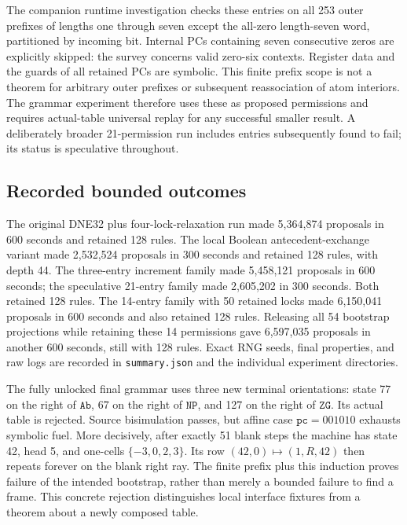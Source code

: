 The companion runtime investigation checks these entries on all 253 outer
prefixes of lengths one through seven except the all-zero length-seven word,
partitioned by incoming bit. Internal PCs containing seven consecutive zeros
are explicitly skipped: the survey concerns valid zero-six contexts. Register
data and the guards of all retained PCs are symbolic. This finite prefix
scope is not a theorem for arbitrary outer prefixes or subsequent reassociation
of atom interiors. The grammar experiment
therefore uses these as proposed permissions and requires actual-table
universal replay for any successful smaller result. A deliberately broader
21-permission run includes entries subsequently found to fail; its status is
speculative throughout.

\subsection{Recorded bounded outcomes}

The original DNE32 plus four-lock-relaxation run made 5,364,874 proposals in
600 seconds and retained 128 rules. The local Boolean antecedent-exchange
variant made 2,532,524 proposals in 300 seconds and retained 128 rules, with
depth 44. The three-entry increment family made 5,458,121 proposals in 600
seconds; the speculative 21-entry family made 2,605,202 in 300 seconds.
Both retained 128 rules. The 14-entry family with 50 retained locks made
6,150,041 proposals in 600 seconds and also retained 128 rules. Releasing all
54 bootstrap projections while retaining these 14 permissions gave 6,597,035
proposals in another 600 seconds, still with 128 rules. Exact RNG
seeds, final properties, and raw logs are recorded in
\texttt{summary.json} and the individual experiment directories.

The fully unlocked final grammar uses three new terminal orientations: state
77 on the right of $\mathtt{Ab}$, 67 on the right of $\mathtt{NP}$, and 127 on
the right of $\mathtt{ZG}$. Its actual table is rejected. Source bisimulation
passes, but affine case $\mathtt{pc}=001010$ exhausts symbolic fuel. More
decisively, after exactly 51 blank steps the machine has state 42, head 5,
and one-cells $\{-3,0,2,3\}$. Its row $(42,0)\mapsto(1,R,42)$ then repeats
forever on the blank right ray. The finite prefix plus this induction proves
failure of the intended bootstrap, rather than merely a bounded failure to
find a frame. This concrete rejection distinguishes local interface fixtures
from a theorem about a newly composed table.

